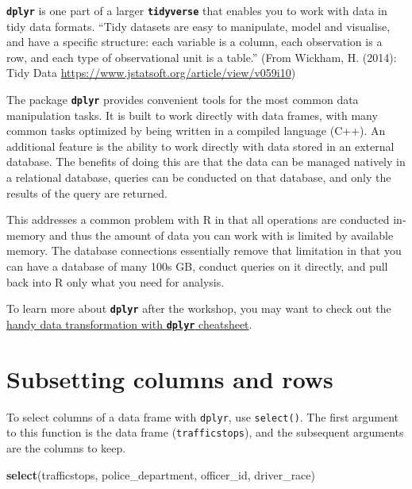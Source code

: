 \documentclass[]{book}
\newenvironment{Shaded}{\begin{snugshade}}{\end{snugshade}}
\newcommand{\KeywordTok}[1]{\textcolor[rgb]{0.13,0.29,0.53}{\textbf{#1}}}
\newcommand{\NormalTok}[1]{#1}
\theoremstyle{definition}
\theoremstyle{definition}
\theoremstyle{definition}
\theoremstyle{remark}
\begin{document}
\textbf{\texttt{dplyr}} is one part of a larger
\textbf{\texttt{tidyverse}} that enables you to work with data in tidy
data formats. ``Tidy datasets are easy to manipulate, model and
visualise, and have a specific structure: each variable is a column,
each observation is a row, and each type of observational unit is a
table.'' (From Wickham, H. (2014): Tidy Data
\url{https://www.jstatsoft.org/article/view/v059i10})

The package \textbf{\texttt{dplyr}} provides convenient tools for the
most common data manipulation tasks. It is built to work directly with
data frames, with many common tasks optimized by being written in a
compiled language (C++). An additional feature is the ability to work
directly with data stored in an external database. The benefits of doing
this are that the data can be managed natively in a relational database,
queries can be conducted on that database, and only the results of the
query are returned.

This addresses a common problem with R in that all operations are
conducted in-memory and thus the amount of data you can work with is
limited by available memory. The database connections essentially remove
that limitation in that you can have a database of many 100s GB, conduct
queries on it directly, and pull back into R only what you need for
analysis.

To learn more about \textbf{\texttt{dplyr}} after the workshop, you may
want to check out the
\href{https://github.com/rstudio/cheatsheets/raw/master/source/pdfs/data-transformation-cheatsheet.pdf}{handy
data transformation with \textbf{\texttt{dplyr}} cheatsheet}.

\section{Subsetting columns and rows}\label{subsetting-columns-and-rows}

To select columns of a data frame with \texttt{dplyr}, use
\texttt{select()}. The first argument to this function is the data frame
(\texttt{trafficstops}), and the subsequent arguments are the columns to
keep.

\begin{Shaded}
\begin{Highlighting}[]
\KeywordTok{select}\NormalTok{(trafficstops, police_department, officer_id, driver_race)}
\end{Highlighting}
\end{Shaded}
\end{document}
